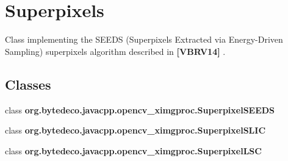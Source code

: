 \hypertarget{group__ximgproc__superpixel}{}\section{Superpixels}
\label{group__ximgproc__superpixel}


Class implementing the S\+E\+E\+DS (Superpixels Extracted via Energy-\/\+Driven Sampling) superpixels algorithm described in {\bfseries [V\+B\+R\+V14]} .  


\subsection*{Classes}
\begin{DoxyCompactItemize}
\item 
class {\bfseries org.\+bytedeco.\+javacpp.\+opencv\+\_\+ximgproc.\+Superpixel\+S\+E\+E\+DS}
\item 
class {\bfseries org.\+bytedeco.\+javacpp.\+opencv\+\_\+ximgproc.\+Superpixel\+S\+L\+IC}
\item 
class {\bfseries org.\+bytedeco.\+javacpp.\+opencv\+\_\+ximgproc.\+Superpixel\+L\+SC}
\end{DoxyCompactItemize}

